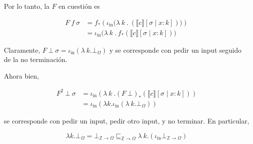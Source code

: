 \documentclass[a4paper, 12pt]{article}
\begin{document}
Por lo tanto, la $F$ en cuestión es

\begin{align*}
  F ~ f ~ \sigma 
  &= f_* \left( \iota_{\text{in}} \big( \lambda ~k~.~\left(
  \llbracket c \rrbracket[\sigma \mid x : k] \right)  \big) \right) \\ 
  &=\iota_{\text{in}}\Big( \lambda ~ k ~ . ~ f_* \left( \llbracket c
  \rrbracket[\sigma \mid x : k] \right)  \Big)
\end{align*}

Claramente, $F ~ \bot ~ \sigma = \iota_{\text{in}}(\lambda ~ k . \bot_\Omega ) 
$ y se corresponde con pedir un input seguido de la no terminación.

Ahora bien,


\begin{align*}
  F^2 ~ \bot ~ \sigma 
  &= \iota_{\text{in}}\left( \lambda ~ k ~ . (F~\bot)_*(\llbracket c
  \rrbracket[\sigma \mid x : k]) \right)  \\ 
  &= \iota_{\text{in}} \left( \lambda k . \iota_{\text{in}}(\lambda ~k.\bot_\Omega)\right)
\end{align*}

se corresponde con pedir un input, pedir otro input, y no terminar. En
particular, 

\begin{equation*}
  \lambda k.\bot_\Omega = \bot_{\mathbb{Z} \to \Omega}
  \sqsubseteq_{\mathbb{Z}\to \Omega} \lambda ~k.(\iota_{\text{in}}
  \bot_{\mathbb{Z}\to \Omega})
\end{equation*}
\end{document}
